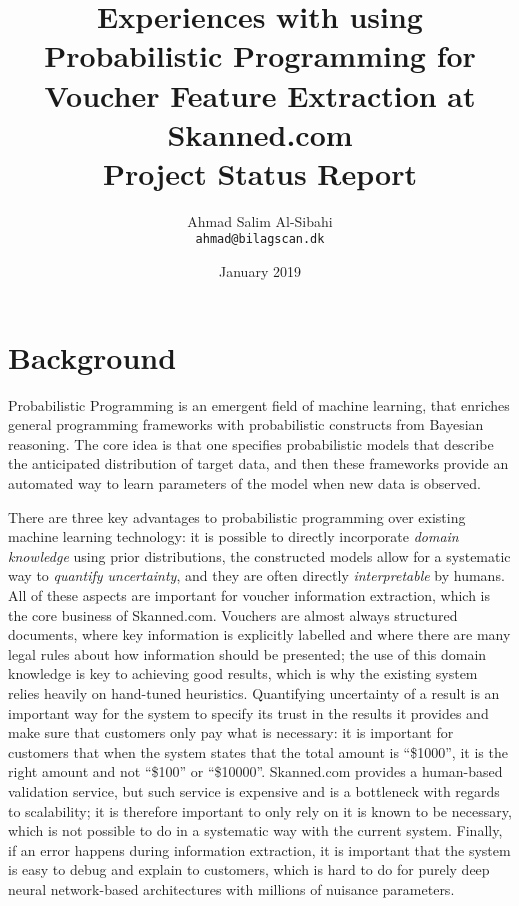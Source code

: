 \documentclass[12pt,a4paper]{article}
\title{
  \vspace{3.5cm}
  \LARGE{Experiences with using Probabilistic Programming for Voucher Feature
    Extraction at Skanned.com} \\
  \Large{Project Status Report}
}
\author{
  \Large{Ahmad Salim Al-Sibahi} \\
  \texttt{ahmad@bilagscan.dk}
}
\date{January 2019}
\def \ColourPDF {cover/bilagscan-farve.pdf}
\begin{document}
 

\clearpage\maketitle
\thispagestyle{empty}

\newpage


\section{Background}
Probabilistic Programming is an emergent field of machine learning, that
enriches general programming frameworks with probabilistic constructs from Bayesian reasoning.
The core idea is that one specifies probabilistic models that describe the
anticipated distribution of target data, and then these frameworks provide an
automated way to learn parameters of the model when new data is observed.

There are three key advantages to probabilistic programming over existing
machine learning technology: it is possible to directly incorporate \emph{domain
knowledge} using prior distributions, the constructed models allow for a systematic way to
\emph{quantify uncertainty}, and they are often directly
\emph{interpretable} by humans. All of these aspects are important for voucher
information extraction, which is the core business of Skanned.com.
Vouchers are almost always structured documents, where key information is
explicitly labelled and where there are many legal rules about how
information should be presented; the use of this domain knowledge is key to
achieving good results, which is why the existing system relies heavily on
hand-tuned heuristics. Quantifying uncertainty of a result is an important way
for the system to specify its trust in the results it provides and make sure
that customers only pay what is necessary: it is important for customers that
when the system states that the total amount is ``\$1000'', it is the right
amount and not ``\$100'' or ``\$10000''. Skanned.com provides a
human-based validation service, but such service is expensive and is a
bottleneck with regards to scalability; it is therefore important to only rely
on it is known to be necessary, which is not possible to do in a systematic way
with the current system.
Finally, if an error happens during information extraction, it is important that
the system is easy to debug and explain to customers, which is hard to do for
purely deep neural network-based architectures with millions of nuisance parameters.
\end{document}
